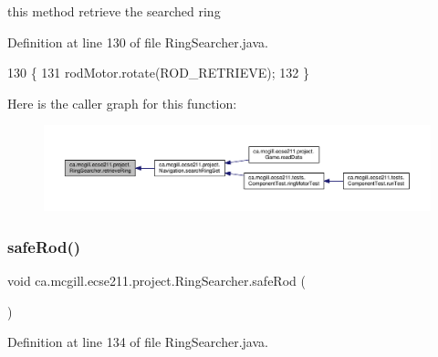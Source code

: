 this method retrieve the searched ring 

Definition at line 130 of file Ring\+Searcher.\+java.


\begin{DoxyCode}
130                              \{
131     rodMotor.rotate(ROD\_RETRIEVE);
132   \}
\end{DoxyCode}
Here is the caller graph for this function\+:
\nopagebreak
\begin{figure}[H]
\begin{center}
\leavevmode
\includegraphics[width=350pt]{classca_1_1mcgill_1_1ecse211_1_1project_1_1_ring_searcher_afca3a0c746b07abb88881d926f4fe71f_icgraph}
\end{center}
\end{figure}
\mbox{\label{classca_1_1mcgill_1_1ecse211_1_1project_1_1_ring_searcher_a0b96c45f7df3eb557496acab33930cd5}} 
\subsubsection{\texorpdfstring{safe\+Rod()}{safeRod()}}
{\footnotesize\ttfamily void ca.\+mcgill.\+ecse211.\+project.\+Ring\+Searcher.\+safe\+Rod (\begin{DoxyParamCaption}{ }\end{DoxyParamCaption})}



Definition at line 134 of file Ring\+Searcher.\+java.


